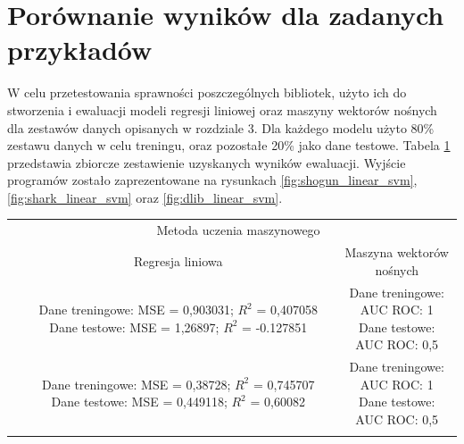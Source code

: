 \section{Porównanie wyników dla zadanych przykładów}

W celu przetestowania sprawności poszczególnych bibliotek, użyto ich do stworzenia i ewaluacji modeli regresji liniowej oraz maszyny wektorów nośnych dla zestawów danych opisanych w rozdziale 3. Dla każdego modelu użyto 80\% zestawu danych w celu treningu, oraz pozostałe 20\% jako dane testowe. Tabela \ref{tab:models} przedstawia zbiorcze zestawienie uzyskanych wyników ewaluacji. Wyjście programów zostało zaprezentowane na rysunkach \ref{fig:shogun_linear_svm}, \ref{fig:shark_linear_svm} oraz \ref{fig:dlib_linear_svm}.

\begin{longtable}{c | c | c }
	\centering
	\multirow{2}{*}{\makecell{Biblioteka}} & \multicolumn{2}{c}{Metoda uczenia maszynowego} \\
	\cline{2-3}
	& Regresja liniowa & Maszyna wektorów nośnych \\
	\hline
	\makecell{Shogun} & \makecell{Dane treningowe: \\ MSE = 0,903031; $R^2$ = 0,407058 \\ Dane testowe: \\ MSE = 1,26897; $R^2$ = -0.127851} & \makecell{Dane treningowe: \\ AUC ROC: 1 \\ Dane testowe: \\ AUC ROC: 0,5} \\
	\hline
	\makecell{Shark} & \makecell{Dane treningowe: \\ MSE = 0,38728; $R^2$ = 0,745707 \\ Dane testowe: \\ MSE = 0,449118; $R^2$ = 0,60082} & \makecell{Dane treningowe: \\ AUC ROC: 1 \\ Dane testowe: \\ AUC ROC: 0,5} \\
	\hline
	\makecell{Dlib} & & 
	\label{tab:models}
\end{longtable} 


